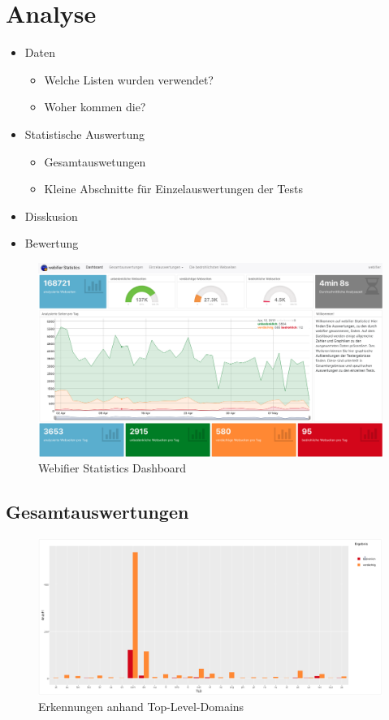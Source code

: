 \chapter{Analyse}

\begin{itemize}
  \item Daten
  \begin{itemize}
    \item Welche Listen wurden verwendet?
    \item Woher kommen die?
  \end{itemize}
  \item Statistische Auswertung
  \begin{itemize}
    \item Gesamtauswetungen
    \item Kleine Abschnitte für Einzelauswertungen der Tests
  \end{itemize}
  \item Disskusion
  \item Bewertung
\end{itemize}


\begin{figure}[H]
  \centering
  \includegraphics[width=15cm]{images/stats/dashboard}
  \caption{Webifier Statistics Dashboard}
  \label{fig:dashboard}
\end{figure}


\section{Gesamtauswertungen}


\begin{figure}[H]
  \centering
  \includegraphics[width=15cm]{images/stats/tlderkennungen}
  \caption{Erkennungen anhand Top-Level-Domains}
  \label{fig:tlderkennungen}
\end{figure}


